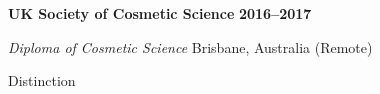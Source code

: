 \textbf{\large UK Society of Cosmetic Science} \hfill \textbf{2016--2017} \par
\vspace{1mm}
\textit{Diploma of Cosmetic Science} \hfill Brisbane, Australia (Remote)\par 
\vspace{1mm}
Distinction\par